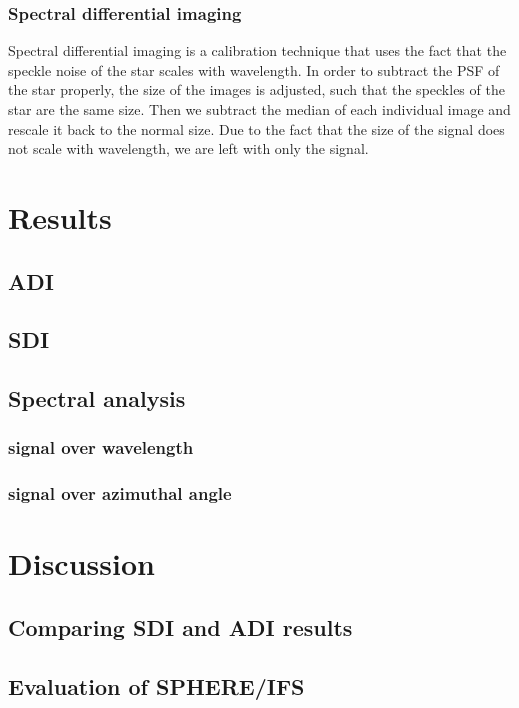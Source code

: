 \documentclass[twoside,single]{lion-msc}
\begin{document}
\subsection{Spectral differential imaging}
Spectral differential imaging is a calibration technique that uses the fact that the speckle noise of the star scales with wavelength. In order to subtract the PSF of the star properly, the size of the images is adjusted, such that the speckles of the star are the same size. Then we subtract the median of each individual image and rescale it back to the normal size. Due to the fact that the size of the signal does not scale with wavelength, we are left with only the signal.

\chapter{Results}
\section{ADI}
\section{SDI}
\section{Spectral analysis}
\subsection{signal over wavelength}
\subsection{signal over azimuthal angle}

\chapter{Discussion}
\section{Comparing SDI and ADI results}
\section{Evaluation of SPHERE/IFS}





%
\end{document}
